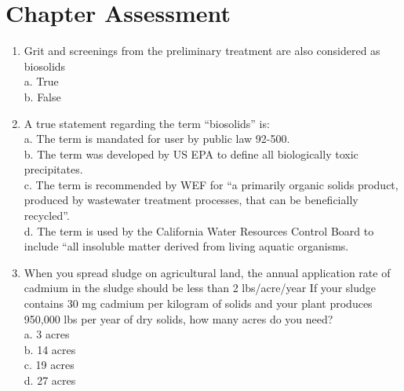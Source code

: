 \section*{Chapter Assessment}
\begin{tcolorbox}[breakable, enhanced,
colframe=blue!25,
colback=blue!10,
coltitle=blue!20!black,  
title= Chapter Assessment]

\begin{enumerate}
\item  Grit and screenings from the preliminary treatment are also considered as biosolids \\

a. True \\
b. False \\

\item  A true statement regarding the term “biosolids” is: \\

a. The term is mandated for user by public law 92-500. \\
b. The term was developed by US EPA to define all biologically toxic precipitates. \\
c. The term is recommended by WEF for “a primarily organic solids product, produced by wastewater treatment processes, that can be beneficially recycled”. \\
d. The term is used by the California Water Resources Control Board to include “all insoluble matter derived from living aquatic organisms. \\

\item  When you spread sludge on agricultural land, the annual application rate of cadmium in the sludge should be less than 2 lbs/acre/year If your sludge contains 30 mg cadmium per kilogram of solids and your plant produces 950,000 lbs per year of dry solids, how many acres do you need? \\

a. 3 acres \\
b. 14 acres \\
c. 19 acres \\
d. 27 acres \\

\end{enumerate}
\end{tcolorbox}

